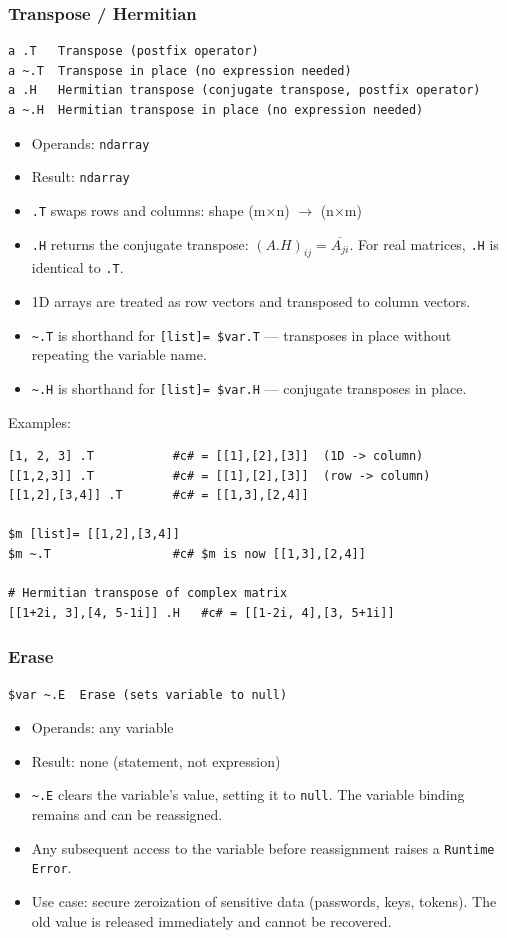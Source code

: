 \subsubsection{Transpose / Hermitian}
\begin{verbatim}
a .T   Transpose (postfix operator)
a ~.T  Transpose in place (no expression needed)
a .H   Hermitian transpose (conjugate transpose, postfix operator)
a ~.H  Hermitian transpose in place (no expression needed)
\end{verbatim}

\begin{itemize}
\item Operands: \texttt{ndarray}
\item Result: \texttt{ndarray}
\item \texttt{.T} swaps rows and columns: shape (m$\times$n) $\rightarrow$ (n$\times$m)
\item \texttt{.H} returns the conjugate transpose: $(A.H)_{ij} = \overline{A_{ji}}$. For real matrices, \texttt{.H} is identical to \texttt{.T}.
\item 1D arrays are treated as row vectors and transposed to column vectors.
\item \texttt{\textasciitilde.T} is shorthand for \texttt{[list]= \$var.T} — transposes in place without repeating the variable name.
\item \texttt{\textasciitilde.H} is shorthand for \texttt{[list]= \$var.H} — conjugate transposes in place.
\end{itemize}

Examples:
\begin{verbatim}
[1, 2, 3] .T           #c# = [[1],[2],[3]]  (1D -> column)
[[1,2,3]] .T           #c# = [[1],[2],[3]]  (row -> column)
[[1,2],[3,4]] .T       #c# = [[1,3],[2,4]]

$m [list]= [[1,2],[3,4]]
$m ~.T                 #c# $m is now [[1,3],[2,4]]

# Hermitian transpose of complex matrix
[[1+2i, 3],[4, 5-1i]] .H   #c# = [[1-2i, 4],[3, 5+1i]]
\end{verbatim}

\subsubsection{Erase}
\begin{verbatim}
$var ~.E  Erase (sets variable to null)
\end{verbatim}

\begin{itemize}
\item Operands: any variable
\item Result: none (statement, not expression)
\item \texttt{\textasciitilde.E} clears the variable's value, setting it to \texttt{null}. The variable binding remains and can be reassigned.
\item Any subsequent access to the variable before reassignment raises a \texttt{Runtime Error}.
\item Use case: secure zeroization of sensitive data (passwords, keys, tokens). The old value is released immediately and cannot be recovered.
\end{itemize}

